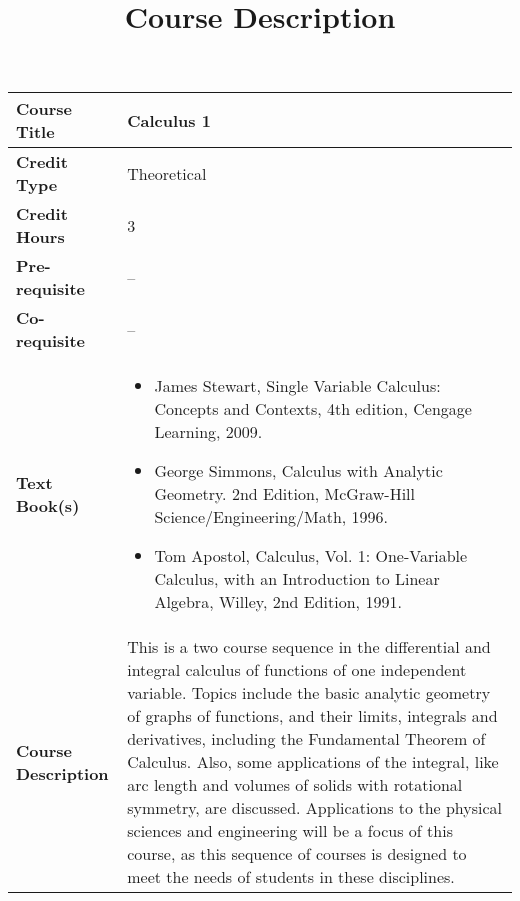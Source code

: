 \documentclass[11pt]{article}
\title{Course Description}
\begin{document}
\maketitle









\begin{table}[h!]
\begin{tabular}{|l|l|}
\hline
\textbf{Course Title}       &  Calculus 1 \\ \hline
\textbf{Credit Type}        &   Theoretical \\ \hline
\textbf{Credit Hours}       &  3\\ \hline
\textbf{Pre-requisite}       & --  \\ \hline
\textbf{Co-requisite}       &  -- \\ \hline
\textbf{Text Book(s)}       & \begin{minipage}{.70\textwidth}
\begin{itemize} \itemsep-0.4em
	\vspace{3mm}
	\item James Stewart, Single Variable Calculus: Concepts and Contexts, 4th edition, Cengage Learning, 2009.
	\item George Simmons, Calculus with Analytic Geometry. 2nd Edition, McGraw-Hill Science/Engineering/Math, 1996.
	\item Tom Apostol, Calculus, Vol. 1: One-Variable Calculus, with an Introduction to Linear Algebra, Willey, 2nd Edition, 1991.
	\vspace{3mm}
\end{itemize}
\end{minipage}\\ \hline
\textbf{Course Description} & \begin{minipage}{.70\textwidth}
\vspace{3mm}

This is a two course sequence in the differential and integral calculus of functions of one independent variable. Topics include the basic analytic geometry of graphs of functions, and their limits, integrals and derivatives, including the Fundamental Theorem of Calculus. Also, some applications of the integral, like arc length and volumes of solids with rotational symmetry, are discussed. Applications to the physical sciences and engineering will be a focus of this course, as this sequence of courses is designed to meet the needs of students in these disciplines.
\newline


\end{minipage}
\end{tabular}
\end{table}
\end{document}
